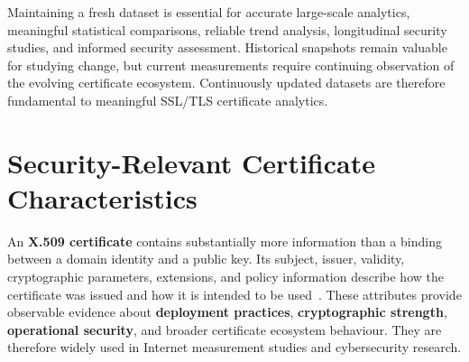 Maintaining a fresh dataset is essential for accurate large-scale analytics,
meaningful statistical comparisons, reliable trend analysis, longitudinal
security studies, and informed security assessment. Historical snapshots remain
valuable for studying change, but current measurements require continuing
observation of the evolving certificate ecosystem. Continuously updated
datasets are therefore fundamental to meaningful SSL/TLS certificate
analytics.

\section{Security-Relevant Certificate Characteristics}
\label{sec:certificate-key-reuse}

An \textbf{X.509 certificate} contains substantially more information than a
binding between a domain identity and a public key. Its subject, issuer,
validity, cryptographic parameters, extensions, and policy information describe
how the certificate was issued and how it is intended to be used~\cite{rfc5280}.
These attributes provide observable evidence about \textbf{deployment
practices}, \textbf{cryptographic strength}, \textbf{operational security}, and
broader certificate ecosystem behaviour. They are therefore widely used in
Internet measurement studies and cybersecurity research.

